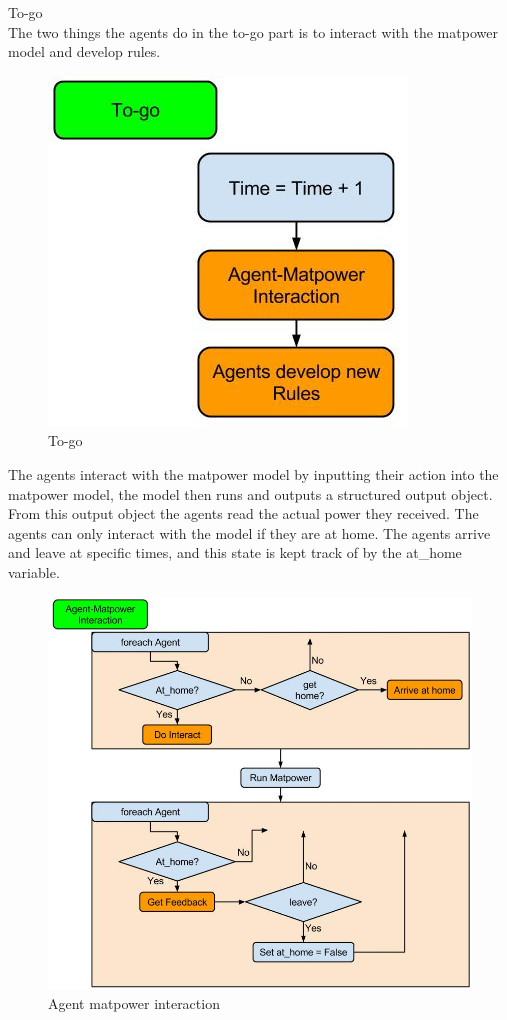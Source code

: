 \documentclass[a4paper]{article}
\begin{document}
To-go \\
The two things the agents do in the to-go part is to interact with the matpower model and develop rules.
\begin{figure}[!ht]
\includegraphics[width =\textwidth]{go.jpg}
\caption{To-go}
\label{to-go}
\end{figure}
The agents interact with the matpower model by inputting their action into the matpower model,
the model then runs and outputs a structured output object. From this output object the agents read
the actual power they received. The agents can only interact with the model if they are at home. 
The agents arrive and leave at specific times, and this state is kept track of by the at\_home variable.
\newpage
\begin{figure}[!ht]
\includegraphics[width =\textwidth]{agent_matpower_interaction.jpg}
\caption{Agent matpower interaction}
\label{agent-matpower-interaction}
\end{figure}
\end{document}
